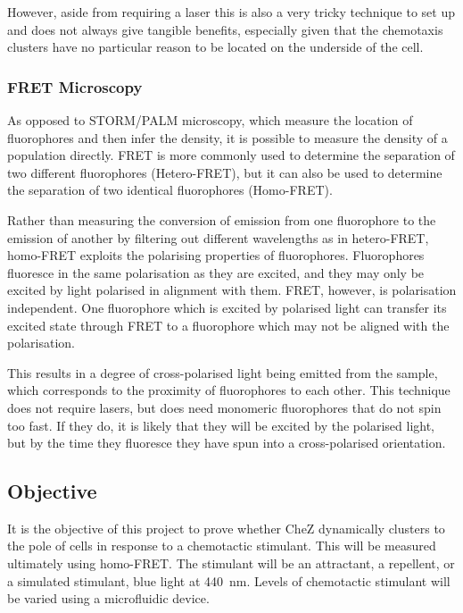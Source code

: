 \documentclass[../main.tex]{subfiles}
\begin{document}
However, aside from requiring a laser this is also a very tricky technique to set up and does not always give tangible benefits, especially given that the chemotaxis clusters have no particular reason to be located on the underside of the cell.

\subsubsection{FRET Microscopy}
As opposed to STORM/PALM microscopy, which measure the location of fluorophores and then infer the density, it is possible to measure the density of a population directly. FRET is more commonly used to determine the separation of two different fluorophores (Hetero-FRET), but it can also be used to determine the separation of two identical fluorophores (Homo-FRET).

Rather than measuring the conversion of emission from one fluorophore to the emission of another by filtering out different wavelengths as in hetero-FRET, homo-FRET exploits the polarising properties of fluorophores. Fluorophores fluoresce in the same polarisation as they are excited, and they may only be excited by light polarised in alignment with them. FRET, however, is polarisation independent. One fluorophore which is excited by polarised light can transfer its excited state through FRET to a fluorophore which may not be aligned with the polarisation. 

This results in a degree of cross-polarised light being emitted from the sample, which corresponds to the proximity of fluorophores to each other. This technique does not require lasers, but does need monomeric fluorophores that do not spin too fast. If they do, it is likely that they will be excited by the polarised light, but by the time they fluoresce they have spun into a cross-polarised orientation.

\subsection{Objective}
It is the objective of this project to prove whether CheZ dynamically clusters to the pole of \ecoli cells in response to a chemotactic stimulant. This will be measured ultimately using homo-FRET. The stimulant will be an attractant, a repellent, or a simulated stimulant, blue light at \SI{440}{\nano\meter}\cite{wright06}. Levels of chemotactic stimulant will be varied using a microfluidic device.
\end{document}
